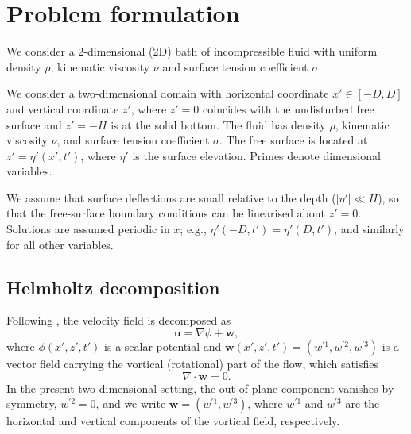 \documentclass{article}
\newcommand{\uu}{\mathbf{u}}
\newcommand{\ww}{\mathbf{w}}
\begin{document}
\section{Problem formulation}
\label{sec:formulation}

We consider a 2-dimensional (2D) bath of incompressible fluid with uniform density $\rho$, kinematic viscosity $\nu$ and surface tension coefficient $\sigma$. 

We consider a two-dimensional domain with horizontal coordinate $x' \in [-D, D]$ and vertical coordinate $z'$, where $z' = 0$ coincides with the undisturbed free surface and $z' = -H$ is at the solid bottom.
The fluid has density $\rho$, kinematic viscosity $\nu$, and surface tension coefficient $\sigma$.
The free surface is located at $z' = \eta'(x', t')$, where $\eta'$ is the surface elevation.
Primes denote dimensional variables.

We assume that surface deflections are small relative to the depth ($|\eta'| \ll H$), so that the free-surface boundary conditions can be linearised about $z' = 0$.
Solutions are assumed periodic in $x$; e.g., $\eta'(-D, t') = \eta'(D, t')$, and similarly for all other variables.

\subsection{Helmholtz decomposition}
\color{blue}
\label{sec:helmholtz}

Following \citet{GaleanoRiosEtAl2017}, the velocity field is decomposed as
\begin{equation}
    \uu = \nabla\phi + \ww, \label{eq:helmholtz}
\end{equation}
where $\phi(x', z', t')$ is a scalar potential and $\ww(x', z', t') = (w^{\prime 1}, w^{\prime 2}, w^{\prime 3})$ is a vector field carrying the vortical (rotational) part of the flow, which satisfies
\begin{equation}
    \nabla \cdot \ww = 0. \label{eq:w_solenoidal}
\end{equation}
In the present two-dimensional setting, the out-of-plane component vanishes by symmetry, $w^{\prime 2} = 0$, and we write $\ww = (w^{\prime 1}, w^{\prime 3})$, where $w^{\prime 1}$ and $w^{\prime 3}$ are the horizontal and vertical components of the vortical field, respectively.
\end{document}
